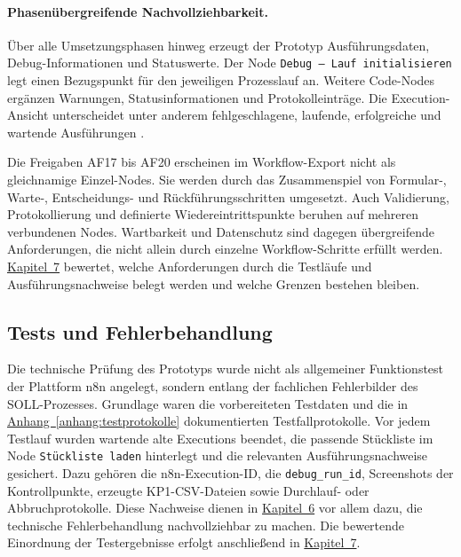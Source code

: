 \documentclass[a4paper,12pt]{article}
\begin{document}
\paragraph{Phasenübergreifende Nachvollziehbarkeit.}
Über alle Umsetzungsphasen hinweg erzeugt der Prototyp Ausführungsdaten, Debug-Informationen und Statuswerte. Der Node \texttt{Debug -- Lauf initialisieren} legt einen Bezugspunkt für den jeweiligen Prozesslauf an. Weitere Code-Nodes ergänzen Warnungen, Statusinformationen und Protokolleinträge. Die Execution-Ansicht unterscheidet unter anderem fehlgeschlagene, laufende, erfolgreiche und wartende Ausführungen \parencite{n8n_docs_2026}.

Die Freigaben AF17 bis AF20 erscheinen im Workflow-Export nicht als gleichnamige Einzel-Nodes. Sie werden durch das Zusammenspiel von Formular-, Warte-, Entscheidungs- und Rückführungsschritten umgesetzt. Auch Validierung, Protokollierung und definierte Wiedereintrittspunkte beruhen auf mehreren verbundenen Nodes. Wartbarkeit und Datenschutz sind dagegen übergreifende Anforderungen, die nicht allein durch einzelne Workflow-Schritte erfüllt werden. \hyperref[sec:evaluation]{Kapitel~7} bewertet, welche Anforderungen durch die Testläufe und Ausführungsnachweise belegt werden und welche Grenzen bestehen bleiben.

\subsection{Tests und Fehlerbehandlung}
Die technische Prüfung des Prototyps wurde nicht als allgemeiner Funktionstest der Plattform n8n angelegt, sondern entlang der fachlichen Fehlerbilder des SOLL-Prozesses. Grundlage waren die vorbereiteten Testdaten und die in \hyperref[anhang:testprotokolle]{Anhang~\ref*{anhang:testprotokolle}} dokumentierten Testfallprotokolle. Vor jedem Testlauf wurden wartende alte Executions beendet, die passende Stückliste im Node \texttt{Stückliste laden} hinterlegt und die relevanten Ausführungsnachweise gesichert. Dazu gehören die n8n-Execution-ID, die \texttt{debug\_run\_id}, Screenshots der Kontrollpunkte, erzeugte KP1-CSV-Dateien sowie Durchlauf- oder Abbruchprotokolle. Diese Nachweise dienen in \hyperref[sec:umsetzung]{Kapitel~6} vor allem dazu, die technische Fehlerbehandlung nachvollziehbar zu machen. Die bewertende Einordnung der Testergebnisse erfolgt anschließend in \hyperref[sec:evaluation]{Kapitel~7}.
\end{document}
